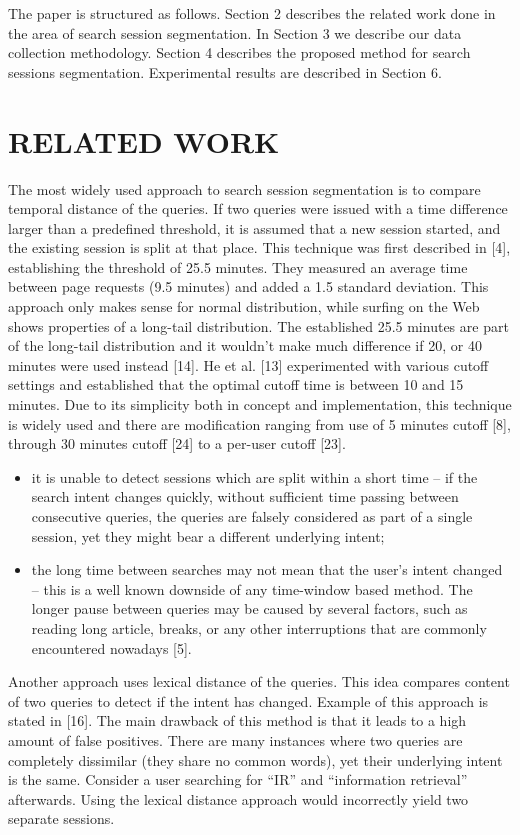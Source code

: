 \documentclass{acm_proc_article-sp} %
\begin{document}
The paper is structured as follows. Section 2 describes the
related work done in the area of search session segmentation.
In Section 3 we describe our data collection methodology.
Section 4 describes the proposed method for search
sessions segmentation. Experimental results are described
in Section 6.

\section{RELATED WORK}

The most widely used approach to search session segmentation
is to compare temporal distance of the queries. If two
queries were issued with a time difference larger than a predefined
threshold, it is assumed that a new session started,
and the existing session is split at that place. This technique
was first described in [4], establishing the threshold
of 25.5 minutes. They measured an average time between
page requests (9.5 minutes) and added a 1.5 standard deviation.
This approach only makes sense for normal distribution,
while surfing on the Web shows properties of a long-tail
distribution. The established 25.5 minutes are part of the
long-tail distribution and it wouldn’t make much difference
if 20, or 40 minutes were used instead [14]. He et al. [13] experimented
with various cutoff settings and established that
the optimal cutoff time is between 10 and 15 minutes. Due
to its simplicity both in concept and implementation, this
technique is widely used and there are modification ranging
from use of 5 minutes cutoff [8], through 30 minutes cutoff
[24] to a per-user cutoff [23].

\begin{itemize}  
	\item it is unable to detect sessions which are split within
	a short time – if the search intent changes quickly,
	without sufficient time passing between consecutive
	queries, the queries are falsely considered as part of
	a single session, yet they might bear a different underlying
	intent;
	\item the long time between searches may not mean that the
	user’s intent changed – this is a well known downside
	of any time-window based method. The longer pause
	between queries may be caused by several factors, such
	as reading long article, breaks, or any other interruptions
	that are commonly encountered nowadays [5].
\end{itemize}

Another approach uses lexical distance of the queries. This
idea compares content of two queries to detect if the intent
has changed. Example of this approach is stated in [16].
The main drawback of this method is that it leads to a high
amount of false positives. There are many instances where
two queries are completely dissimilar (they share no common
words), yet their underlying intent is the same. Consider
a user searching for “IR” and “information retrieval”
afterwards. Using the lexical distance approach would incorrectly
yield two separate sessions.
\end{document}
